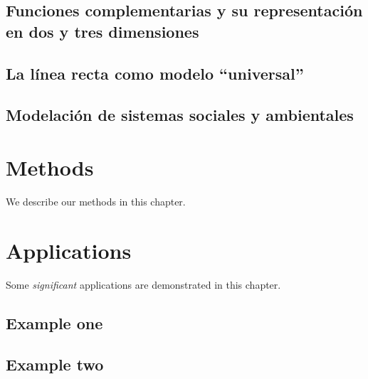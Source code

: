 \documentclass[
]{book}
\begin{document}
\hypertarget{funciones-complementarias-y-su-representaciuxf3n-en-dos-y-tres-dimensiones}{%
\section{Funciones complementarias y su representación en dos y tres dimensiones}\label{funciones-complementarias-y-su-representaciuxf3n-en-dos-y-tres-dimensiones}}

\hypertarget{la-luxednea-recta-como-modelo-universal}{%
\section{La línea recta como modelo ``universal''}\label{la-luxednea-recta-como-modelo-universal}}

\hypertarget{modelaciuxf3n-de-sistemas-sociales-y-ambientales}{%
\section{Modelación de sistemas sociales y ambientales}\label{modelaciuxf3n-de-sistemas-sociales-y-ambientales}}

\hypertarget{methods}{%
\chapter{Methods}\label{methods}}

We describe our methods in this chapter.

\hypertarget{applications}{%
\chapter{Applications}\label{applications}}

Some \emph{significant} applications are demonstrated in this chapter.

\hypertarget{example-one}{%
\section{Example one}\label{example-one}}

\hypertarget{example-two}{%
\section{Example two}\label{example-two}}

  
\end{document}

